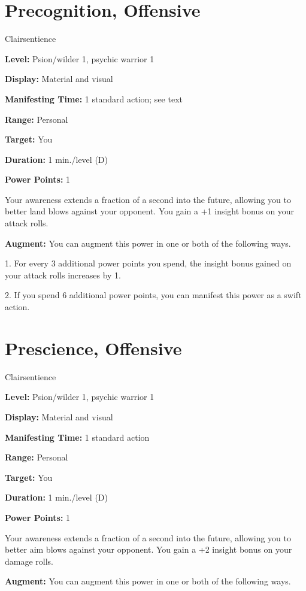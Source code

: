 \documentclass{article}
\begin{document}
\vspace{12pt}
\section*{Precognition, Offensive}

Clairsentience

\textbf{Level:} Psion/wilder 1, psychic warrior 1

\textbf{Display:} Material and visual

\textbf{Manifesting Time:} 1 standard action; see text

\textbf{Range:} Personal

\textbf{Target:} You

\textbf{Duration:} 1 min./level (D)

\textbf{Power Points:} 1

Your awareness extends a fraction of a second into the future, allowing you to 
better land blows against your opponent. You gain a +1 insight bonus on your attack 
rolls.

\textbf{Augment:} You can augment this power in one or both of the following ways.

1. For every 3 additional power points you spend, the insight bonus gained on your 
attack rolls increases by 1.

2. If you spend 6 additional power points, you can manifest this power as a swift 
action.

\vspace{12pt}
\section*{Prescience, Offensive}

Clairsentience

\textbf{Level:} Psion/wilder 1, psychic warrior 1

\textbf{Display:} Material and visual

\textbf{Manifesting Time:} 1 standard action

\textbf{Range:} Personal

\textbf{Target:} You

\textbf{Duration:} 1 min./level (D)

\textbf{Power Points:} 1

Your awareness extends a fraction of a second into the future, allowing you to 
better aim blows against your opponent. You gain a +2 insight bonus on your damage 
rolls.

\textbf{Augment:} You can augment this power in one or both of the following ways.
\end{document}

